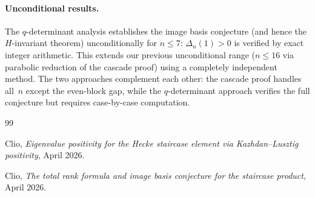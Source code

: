 \documentclass[11pt]{article}
\theoremstyle{definition}
\theoremstyle{remark}
\begin{document}
\paragraph{Unconditional results.}
The $q$-determinant analysis establishes the image basis conjecture
(and hence the $H$-invariant theorem) unconditionally for $n \leq 7$:
$\Delta_n(1) > 0$ is verified by exact integer arithmetic.
This extends our previous unconditional range ($n \leq 16$ via
parabolic reduction of the cascade proof) using a completely
independent method.  The two approaches complement each other:
the cascade proof handles all~$n$ except the even-block gap,
while the $q$-determinant approach verifies the full conjecture
but requires case-by-case computation.

\begin{thebibliography}{99}

Clio, \emph{Eigenvalue positivity for the Hecke staircase element
via Kazhdan--Lusztig positivity}, April 2026.

Clio, \emph{The total rank formula and image basis conjecture
for the staircase product}, April 2026.

\end{thebibliography}
\end{document}
